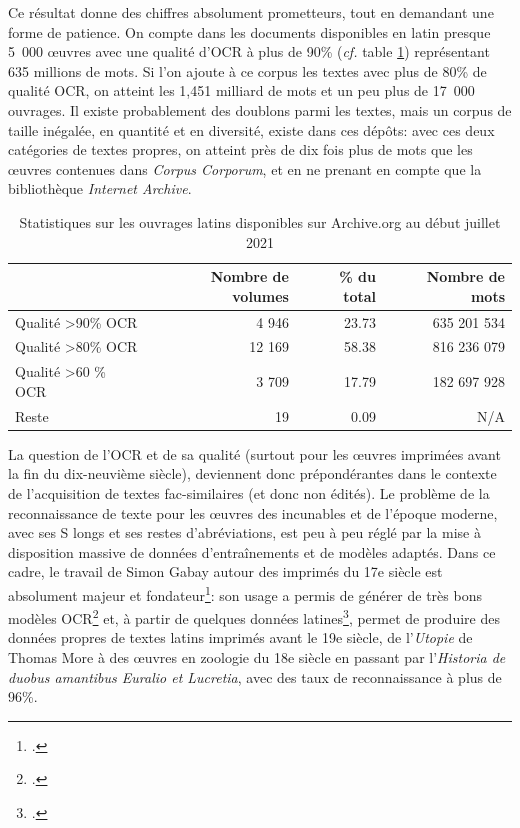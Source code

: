 Ce résultat donne des chiffres absolument prometteurs, tout en demandant une forme de patience. On compte dans les documents disponibles en latin presque 5~000 œuvres avec une qualité d'OCR à plus de 90\% (\textit{cf.} table \ref{tab:chap1:latin-OCR}) représentant 635 millions de mots. Si l'on ajoute à ce corpus les textes avec plus de 80\% de qualité OCR, on atteint les 1,451 milliard de mots et un peu plus de 17~000 ouvrages. Il existe probablement des doublons parmi les textes, mais un corpus de taille inégalée, en quantité et en diversité, existe dans ces dépôts: avec ces deux catégories de textes propres, on atteint près de dix fois plus de mots que les œuvres contenues dans \textit{Corpus Corporum}, et en ne prenant en compte que la bibliothèque \textit{Internet Archive}.

\begin{table}[ht]
\centering
\begin{tabular}{l|rrr}
\toprule
                               & Nombre de volumes & \% du total & Nombre de mots \\ \midrule
Qualité \textgreater 90\% OCR  & 4 946              & 23.73       & 635 201 534    \\
Qualité \textgreater 80\% OCR  & 12 169             & 58.38       & 816 236 079      \\
Qualité \textgreater 60 \% OCR & 3 709              & 17.79       & 182 697 928      \\
Reste                          & 19                 & 0.09        & N/A           \\ \bottomrule
\end{tabular}
\caption{Statistiques sur les ouvrages latins disponibles sur Archive.org au début juillet 2021}
\label{tab:chap1:latin-OCR}
\end{table}

La question de l'OCR et de sa qualité (surtout pour les œuvres imprimées avant la fin du dix-neuvième siècle), deviennent donc prépondérantes dans le contexte de l'acquisition de textes fac-similaires (et donc non édités). Le problème de la reconnaissance de texte pour les œuvres des incunables et de l'époque moderne, avec ses S longs et ses restes d'abréviations, est peu à peu réglé par la mise à disposition massive de données d'entraînements et de modèles adaptés. Dans ce cadre, le travail de Simon Gabay autour des imprimés du 17e siècle est absolument majeur et fondateur\footcite{simon_gabay_2020_3826894}: son usage a permis de générer de très bons modèles OCR\footcite{gabay:hal-02577236} et, à partir de quelques données latines\footcite{Clerice_CREMMA_16_18_Prints_2021}, permet de produire des données propres de textes latins imprimés avant le 19e siècle, de l'\textit{Utopie} de Thomas More à des œuvres en zoologie du 18e siècle en passant par l'\textit{Historia de duobus amantibus Euralio et Lucretia}, avec des taux de reconnaissance à plus de 96\%. 

